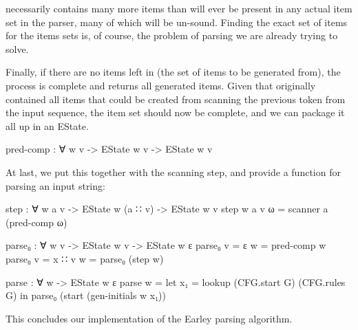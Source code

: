 		 necessarily contains many more items than will ever
		be present in any actual item set in the parser, many of which will be
		un-sound. Finding the exact set of items for the items sets is, of
		course, the problem of parsing we are already trying to solve.

		Finally, if there are no items left in  (the set of items to
		be generated from), the process is complete and 
		returns all generated items. Given that  originally
		contained all items that could be created from scanning the previous
		token from the input sequence, the item set should now be complete, and
		we can package it all up in an EState.

		\begin{code}
			pred-comp : ∀ {w v} -> EState w v -> EState w v
		\end{code}

		At last, we put this together with the scanning step, and provide a
		function for parsing an input string:

		\begin{code}
			step : ∀ {w a v} ->
			  EState w (a ∷ v) ->
			  EState w v
			step {w} {a} {v} ω = scanner a (pred-comp ω)

			parse₀ : ∀ {w v} ->
			   EState w v ->
			   EState w ε
			parse₀ {v = ε} w = pred-comp w
			parse₀ {v = x ∷ v} w = parse₀ (step w)

			parse : ∀ w -> EState w ε
			parse w =
			  let x₁ = lookup (CFG.start G) (CFG.rules G) in
			  parse₀ (start (gen-initials w x₁))
		\end{code}

		This concludes our implementation of the Earley parsing algorithm.
